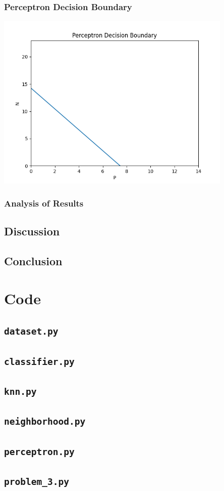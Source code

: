 \documentclass[a4paper, 11pt, titlepage]{article}
\begin{document}
  \subsubsection{Perceptron Decision Boundary}
  \par \includegraphics[width=0.85\textwidth]{images/perceptron_dec_bound.png}
  \subsubsection{Analysis of Results}
  \subsection{Discussion}
  \subsection{Conclusion}
  \pagebreak
  \appendix
  \section{Code}
  \subsection{\texttt{dataset.py}}
  
  \subsection{\texttt{classifier.py}}
  
  \subsection{\texttt{knn.py}}
  
  \subsection{\texttt{neighborhood.py}}
  
  \subsection{\texttt{perceptron.py}}
  
  \subsection{\texttt{problem\_3.py}}
  
\end{document}
